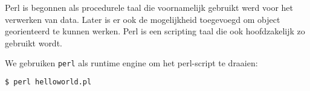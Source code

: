 Perl is begonnen als procedurele taal die voornamelijk gebruikt werd voor het verwerken van data. Later is er ook de mogelijkheid toegevoegd om object georienteerd te kunnen werken. Perl is een scripting taal die ook hoofdzakelijk zo gebruikt wordt.



We gebruiken \texttt{perl} als runtime engine om het perl-script te draaien:
\begin{lstlisting}[language=bash]
$ perl helloworld.pl
\end{lstlisting}
